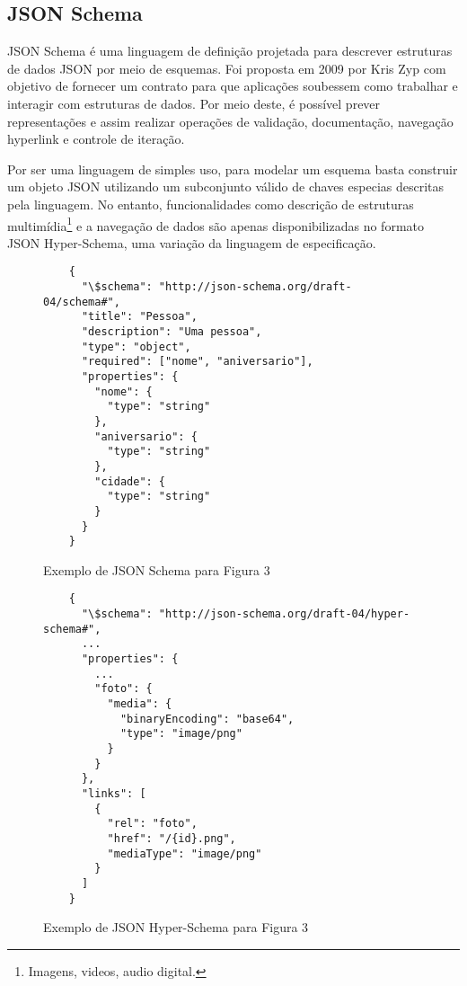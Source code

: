 \subsection[JSON Schema]{JSON Schema}

JSON Schema é uma linguagem de definição projetada para descrever estruturas de dados JSON por meio de esquemas. Foi proposta em 2009 por Kris Zyp com objetivo de fornecer um contrato para que aplicações soubessem como trabalhar e interagir com estruturas de dados. Por meio deste, é possível prever representações e assim realizar operações de validação, documentação, navegação hyperlink e controle de iteração.

Por ser uma linguagem de simples uso, para modelar um esquema basta construir um objeto JSON utilizando um subconjunto válido de chaves especias descritas pela linguagem. No entanto, funcionalidades como descrição de estruturas multimídia\footnote{
  Imagens, videos, audio digital.
} e a navegação de dados são apenas disponibilizadas no formato JSON Hyper-Schema, uma variação da linguagem de especificação. \cite{Jackson2016}

\begin{figure}[H]
  \centering
  \begin{verbatim}
    {
      "\$schema": "http://json-schema.org/draft-04/schema#",
      "title": "Pessoa",
      "description": "Uma pessoa",
      "type": "object",
      "required": ["nome", "aniversario"],
      "properties": {
        "nome": {
          "type": "string"
        },
        "aniversario": {
          "type": "string"
        },
        "cidade": {
          "type": "string"
        }
      }
    }
  \end{verbatim}
  \caption{Exemplo de JSON Schema para Figura 3}
\end{figure}

\begin{figure}[H]
  \centering
  \begin{verbatim}
    {
      "\$schema": "http://json-schema.org/draft-04/hyper-schema#",
      ...
      "properties": {
        ...
        "foto": {
          "media": {
            "binaryEncoding": "base64",
            "type": "image/png"
          }
        }
      },
      "links": [
        {
          "rel": "foto",
          "href": "/{id}.png",
          "mediaType": "image/png"
        }
      ]
    }
  \end{verbatim}
  \caption{Exemplo de JSON Hyper-Schema para Figura 3}
\end{figure}

